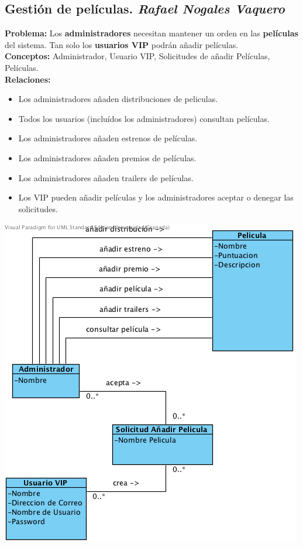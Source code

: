 \documentclass{article}
\begin{document}
	\subsection*{Gestión de películas. \textit{Rafael Nogales Vaquero}}
	\textbf{Problema:} Los \textbf{administradores} necesitan mantener un orden en las \textbf{películas} del sistema.
	 Tan solo los \textbf{usuarios VIP} podrán añadir películas.\\
	\textbf{Conceptos:} Administrador, Usuario VIP, Solicitudes de añadir Películas, Películas.\\
	\textbf{	Relaciones:}
		\begin{itemize}
			\item Los administradores añaden distribuciones de peliculas.
			\item Todos los usuarios (incluídos los administradores) consultan películas.
			\item Los administradores añaden estrenos de películas.
			\item Los administradores añaden premios de películas.
			\item Los administradores añaden trailers de películas.
			\item Los VIP pueden añadir películas y los administradores aceptar o denegar las solicitudes.		
		\end{itemize}
	\includegraphics[width=0.7\linewidth]{./C-GestionDePeliculas}
	
	
\end{document}
